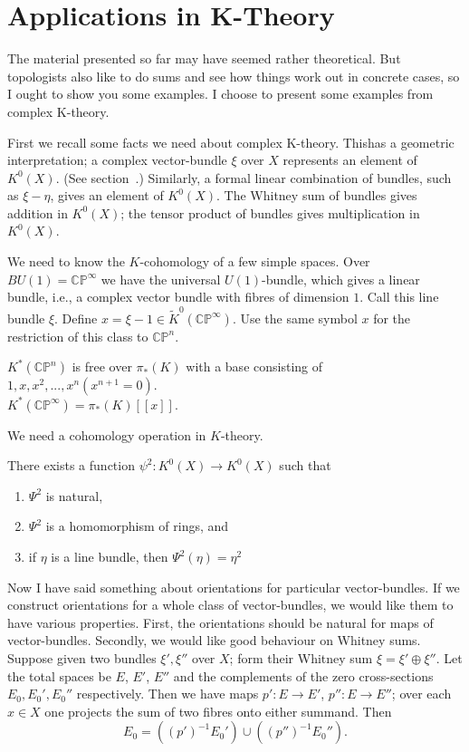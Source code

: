 \documentclass[../main]{subfiles}
\begin{document}
\chapter{Applications in K-Theory}
\label{sec:p3c11}
The material presented so far may have seemed rather theoretical. But topologists also like to do sums and see how things work out in concrete cases, so I ought to show you some examples. I choose to present some examples from complex K-theory.
\par First we recall some facts we need about complex K-theory. Thishas a geometric interpretation; a complex vector-bundle $\xi$ over $X$ represents an element of $K^0(X)$. (See section~.) Similarly, a formal linear combination of bundles, such as $\xi-\eta$, gives an element of $K^0(X)$. The Whitney sum of bundles gives addition in $K^0(X)$;  the tensor product of bundles gives multiplication in $K^0(X)$.
\par We need to know the $K$-cohomology of a few simple spaces. Over $BU(1)=\mathbb{CP}^\infty$ we have the universal $U(1)$-bundle, which gives a linear bundle, i.e., a complex vector bundle with fibres of dimension $1$. Call this line bundle $\xi$. Define $x=\xi - 1 \in \tilde{K}^0(\mathbb{CP}^\infty)$. Use the same symbol $x$ for the restriction of this class to $\mathbb{CP}^n$.
\begin{proposition}\label{prop:p3ch11.1}
$K^*(\mathbb{CP}^n)$ is free over $\pi_*(K)$ with a base consisting of $1,x,x^2,...,x^n (x^{n+1}=0)$. \\$K^*(\mathbb{CP}^\infty)=\pi_*(K)[[x]].$
\end{proposition}
\par We need a cohomology operation in $K$-theory.
\begin{proposition}\label{prop:p3ch11.2}
There exists a function $\psi^2:K^0(X)\longrightarrow K^0(X)$ such that \begin{enumerate}
    \item $\Psi^2$ is natural,
    \item $\Psi^2$ is a homomorphism of rings, and
    \item if $\eta$ is a line bundle, then $\Psi^2(\eta)=\eta^2$
\end{enumerate}
\end{proposition}
\par Now I have said something about orientations for particular vector-bundles. If we construct orientations for a whole class of vector-bundles, we would like them to have various properties. First, the orientations should be natural for maps of vector-bundles. Secondly, we would like good behaviour on Whitney sums. Suppose given two bundles $\xi',\xi''$ over $X$; form their Whitney sum $\xi=\xi'\oplus\xi''$. Let the total spaces be $E$, $E'$, $E''$ and the complements of the zero cross-sections $E_0, E_0', E_0''$ respectively. Then we have maps $p':E\longrightarrow E'$, $p'':E\longrightarrow E''$; over each $x\in X$ one projects the sum of two fibres onto either summand. Then $$E_0=((p')^{-1}E_0')\cup ((p'')^{-1}E_0'').$$
\end{document}
